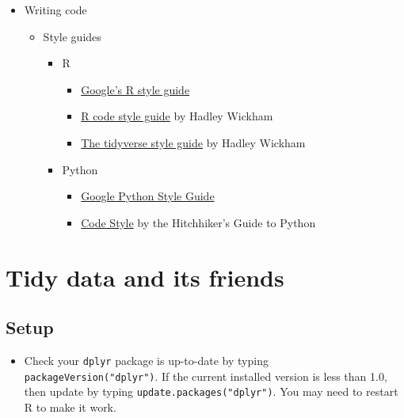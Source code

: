 \documentclass[
]{book}
\providecommand{\tightlist}{%
  \setlength{\itemsep}{0pt}\setlength{\parskip}{0pt}}
\begin{document}
\begin{itemize}
\item
  Writing code

  \begin{itemize}
  \tightlist
  \item
    Style guides

    \begin{itemize}
    \tightlist
    \item
      R

      \begin{itemize}
      \tightlist
      \item
        \href{https://google.GitHub.io/styleguide/Rguide.xml}{Google's R style guide}
      \item
        \href{http://r-pkgs.had.co.nz/r.html}{R code style guide} by Hadley Wickham
      \item
        \href{http://style.tidyverse.org/}{The tidyverse style guide} by Hadley Wickham
      \end{itemize}
    \item
      Python

      \begin{itemize}
      \tightlist
      \item
        \href{https://GitHub.com/google/styleguide/blob/gh-pages/pyguide.md}{Google Python Style Guide}
      \item
        \href{https://docs.python-guide.org/writing/style/\#zen-of-python}{Code Style} by the Hitchhiker's Guide to Python
      \end{itemize}
    \end{itemize}
  \end{itemize}
\end{itemize}

\hypertarget{tidy_data}{%
\chapter{Tidy data and its friends}\label{tidy_data}}

\hypertarget{setup-2}{%
\section{Setup}\label{setup-2}}

\begin{itemize}
\tightlist
\item
  Check your \texttt{dplyr} package is up-to-date by typing \texttt{packageVersion("dplyr")}. If the current installed version is less than 1.0, then update by typing \texttt{update.packages("dplyr")}. You may need to restart R to make it work.
\end{itemize}
\end{document}
